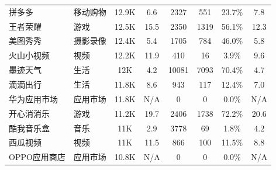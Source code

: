 \begin{ThreePartTable}
\begin{longtable}{l l c c c c c c}
        拼多多                          & 移动购物   & 12.9K                      & 6.6                        & 2327           & 551                        & 23.7\%       & 7.8                        \\
        \rowcolor{gray!15} 王者荣耀     & 游戏       & 12.5K                      & 15.5                       & 2350           & 1319                       & 56.1\%       & 12.3                       \\
        美图秀秀                        & 摄影录像   & 12.4K                      & 5.4                        & 1705           & 784                        & 46.0\%       & 5.8                        \\
        \rowcolor{gray!15} 火山小视频   & 视频       & 12.2K                      & 11.9                       & 410            & 16                         & 3.9\%        & 9.6                        \\
        墨迹天气                        & 生活       & 12K                        & 4.2                        & 10081          & 7093                       & 70.4\%       & 4.7                        \\
        \rowcolor{gray!15} 滴滴出行     & 生活       & 11.8K                      & 8.6                        & 943            & 117                        & 12.4\%       & 7.0                        \\
        华为应用市场                    & 应用市场   & 11.8K                      & N/A                        & 0              & 0                          & 0.0\%        & N/A                        \\
        \rowcolor{gray!15} 开心消消乐   & 游戏       & 11.2K                      & 19.7                       & 2406           & 1738                       & 72.2\%       & 20.6                       \\
        酷我音乐盒                      & 音乐       & 11K                        & 2.9                        & 3778           & 69                         & 1.8\%        & 4.2                        \\
        \rowcolor{gray!15} 西瓜视频     & 视频       & 11K                        & 11.5                       & 866            & 100                        & 11.5\%       & 8.8                        \\
        OPPO应用商店                    & 应用市场   & 10.8K                      & N/A                        & 0              & 0                          & 0.0\%        & N/A                        \\

\end{longtable}
\end{ThreePartTable}
